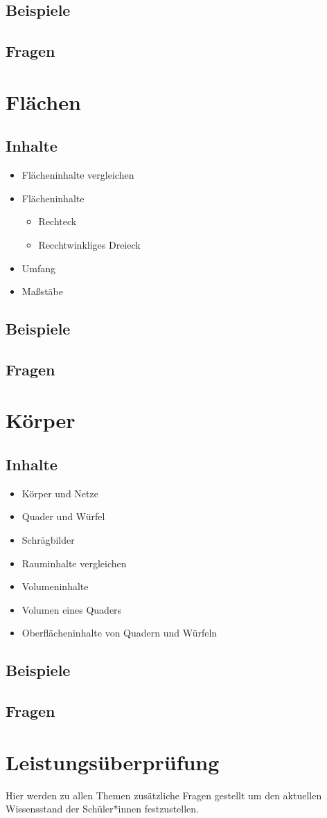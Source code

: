 \documentclass{article}
\begin{document}
\subsection{Beispiele}
\subsection{Fragen}
\newpage
\section{Flächen}
\subsection{Inhalte}
\begin{itemize}
    \item Flächeninhalte vergleichen
    \item Flächeninhalte
    \begin{itemize}
        \item Rechteck
        \item Recchtwinkliges Dreieck
    \end{itemize}
    \item Umfang
    \item Maßstäbe
\end{itemize}
\subsection{Beispiele}
\subsection{Fragen}
\newpage
\section{Körper}
\subsection{Inhalte}
\begin{itemize}
    \item Körper und Netze
    \item Quader und Würfel
    \item Schrägbilder
    \item Rauminhalte vergleichen
    \item Volumeninhalte
    \item Volumen eines Quaders
    \item Oberflächeninhalte von Quadern und Würfeln
\end{itemize}
\subsection{Beispiele}
\subsection{Fragen}
\newpage
\section*{Leistungsüberprüfung}
Hier werden zu allen Themen zusätzliche Fragen gestellt um den aktuellen Wissensstand der Schüler*innen festzustellen.
\end{document}
